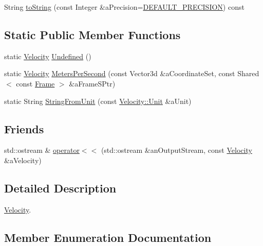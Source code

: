 \begin{DoxyCompactItemize}
\item 
String \hyperlink{classostk_1_1physics_1_1coord_1_1_velocity_a48227bc666c8b559df29b5a812aa5ab2}{to\+String} (const Integer \&a\+Precision=\hyperlink{_velocity_8hpp_a6d81881a7883657dbc659ca545d9085d}{D\+E\+F\+A\+U\+L\+T\+\_\+\+P\+R\+E\+C\+I\+S\+I\+ON}) const
\end{DoxyCompactItemize}
\subsection*{Static Public Member Functions}
\begin{DoxyCompactItemize}
\item 
static \hyperlink{classostk_1_1physics_1_1coord_1_1_velocity}{Velocity} \hyperlink{classostk_1_1physics_1_1coord_1_1_velocity_a3eb51fc62403ba59256b5b0a816a6392}{Undefined} ()
\item 
static \hyperlink{classostk_1_1physics_1_1coord_1_1_velocity}{Velocity} \hyperlink{classostk_1_1physics_1_1coord_1_1_velocity_a9c21dc239f2109c9698ac752b3d395b7}{Meters\+Per\+Second} (const Vector3d \&a\+Coordinate\+Set, const Shared$<$ const \hyperlink{classostk_1_1physics_1_1coord_1_1_frame}{Frame} $>$ \&a\+Frame\+S\+Ptr)
\item 
static String \hyperlink{classostk_1_1physics_1_1coord_1_1_velocity_a9a016d320278b1de234fa5dc2c96370d}{String\+From\+Unit} (const \hyperlink{classostk_1_1physics_1_1coord_1_1_velocity_a01701e56094328a31d0211da5ac1ba28}{Velocity\+::\+Unit} \&a\+Unit)
\end{DoxyCompactItemize}
\subsection*{Friends}
\begin{DoxyCompactItemize}
\item 
std\+::ostream \& \hyperlink{classostk_1_1physics_1_1coord_1_1_velocity_ab3987a176df736aa7fa50aa763ed068b}{operator$<$$<$} (std\+::ostream \&an\+Output\+Stream, const \hyperlink{classostk_1_1physics_1_1coord_1_1_velocity}{Velocity} \&a\+Velocity)
\end{DoxyCompactItemize}


\subsection{Detailed Description}
\hyperlink{classostk_1_1physics_1_1coord_1_1_velocity}{Velocity}. 

\subsection{Member Enumeration Documentation}
\mbox{\label{classostk_1_1physics_1_1coord_1_1_velocity_a01701e56094328a31d0211da5ac1ba28}} 
